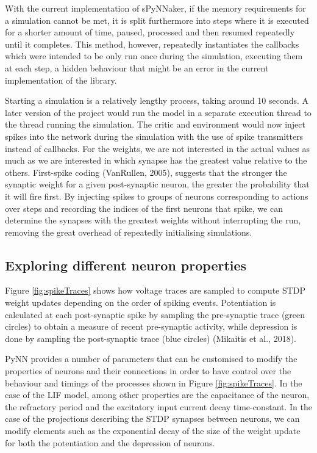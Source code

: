 \documentclass[10pt]{article}
\begin{document}
    With the current implementation of sPyNNaker, if the memory requirements for a simulation cannot be met, it is split furthermore into steps where it is executed for a shorter amount of time, paused, processed and then resumed repeatedly until it completes. This method, however, repeatedly instantiates the callbacks which were intended to be only run once during the simulation, executing them at each step, a hidden behaviour that might be an error in the current implementation of the library.
    
    Starting a simulation is a relatively lengthy process, taking around 10 seconds. A later version of the project would run the model in a separate execution thread to the thread running the simulation. The critic and environment would now inject spikes into the network during the simulation with the use of spike transmitters instead of callbacks. For the weights, we are not interested in the actual values as much as we are interested in which synapse has the greatest value relative to the others. First-spike coding (VanRullen, 2005), suggests that the stronger the synaptic weight for a given post-synaptic neuron, the greater the probability that it will fire first. By injecting spikes to groups of neurons corresponding to actions over steps and recording the indices of the first neurons that spike, we can determine the synapses with the greatest weights without interrupting the run, removing the great overhead of repeatedly initialising simulations.

    \subsection{Exploring different neuron properties}

    Figure \ref{fig:spikeTraces} shows how voltage traces are sampled to compute STDP weight updates depending on the order of spiking events. Potentiation is calculated at each post-synaptic spike by sampling the pre-synaptic trace (green circles) to obtain a measure of recent pre-synaptic activity, while depression is done by sampling the post-synaptic trace (blue circles) (Mikaitis et al., 2018).

    PyNN provides a number of parameters that can be customised to modify the properties of neurons and their connections in order to have control over the behaviour and timings of the processes shown in Figure \ref{fig:spikeTraces}. In the case of the LIF model, among other properties are the capacitance of the neuron, the refractory period and the excitatory input current decay time-constant. In the case of the projections describing the STDP synapses between neurons, we can modify elements such as the exponential decay of the size of the weight update for both the potentiation and the depression of neurons.
\end{document}
